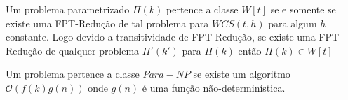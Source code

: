 \begin{definition}
 Um problema parametrizado $\Pi(k)$ pertence a classe $W[t]$ se e somente se existe uma FPT-Redução de tal problema para $WCS(t,h)$ para algum $h$ constante. Logo devido a transitividade de FPT-Redução, se existe uma FPT-Redução de qualquer problema $\Pi'(k')$ para $\Pi(k)$ então $\Pi(k) \in W[t]$
\end{definition}

\begin{definition}
 Um problema pertence a classe $Para-NP$ se existe um algoritmo $\mathcal{O}(f(k)g(n))$ onde $g(n)$ é uma função não-determinística.
\end{definition}
